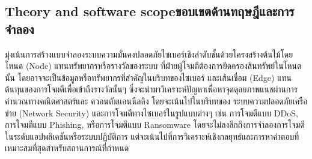 \subsection{\ifenglish Theory and software scope\else  ขอบเขตด้านทฤษฎีและการจำลอง\fi}
มุ่งเน้นการสร้างแบบจำลองระบบความมั่นคงปลอดภัยไซเบอร์เชิงลำดับชั้นด้วยโครงสร้างต้นไม้โดยโหนด (Node) แทนทรัพยากรหรือรางวัลของระบบ ที่ฝ่ายผู้โจมตีต้องการยึดครองสินทรัพย์ในโหนดนั้น โดยอาจจะเป็นข้อมูลหรือทรัพยากรที่สำคัญในบริบทของไซเบอร์ และเส้นเชื่อม (Edge) แทนต้นทุนของการโจมตีเพื่อเข้าถึงรางวัลนั้นๆ ซึ่งจะนำมาวิเคราะห์ปัญหาเพื่อหาจุดดุลยภาพแนชผ่านการคำนวณทางคณิตศาสตร์และ ควอนตัมแอนนีลลิง โดยจะเน้นไปในบริบทของ ระบบความปลอดภัยเครือข่าย (Network Security) และการโจมตีทางไซเบอร์ในรูปแบบต่างๆ เช่น การโจมตีแบบ DDoS, การโจมตีแบบ Phishing, หรือการโจมตีแบบ Ransomware โดยจะไม่ลงลึกถึงการจำลองการโจมตีในระดับแอปพลิเคชันหรือระบบปฏิบัติการ แต่จะเน้นไปที่การวิเคราะห์เชิงกลยุทธ์และการหาคำตอบที่เหมาะสมที่สุดสำหรับสถานการณ์ที่กำหนด

